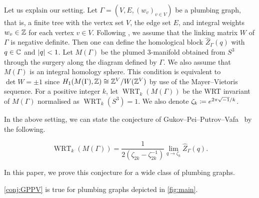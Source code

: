 \documentclass[11pt,a4paper,lualatex]{amsart}
\DeclareMathOperator{\WRT}{WRT}
\numberwithin{equation}{section} %
\begin{document}
Let us explain our setting.
Let $ \Gamma = (V, E, (w_v)_{v \in V}) $ be a plumbing graph, that is, a finite tree with the vertex set $ V $, the edge set $ E $, and integral weights $ w_v \in \mathbb{Z} $ for each vertex $ v \in V $.
Following \cite{GPPV}, we assume that the linking matrix $ W $ of $ \Gamma $ is negative definite.
Then one can define the homological block $ \widehat{Z}_\Gamma (q) $ with $ q \in \mathbb{C} $ and $ \left\lvert q\right\rvert < 1 $. 
Let $ M(\Gamma) $ be the plumed 3-manifold obtained from $ S^3 $ through the surgery along the diagram defined by $ \Gamma $.
We also assume that $ M(\Gamma) $ is an integral homology sphere.
This condition is equivalent to $ \det W = \pm 1 $ since $ H_1(M(\Gamma), \mathbb{Z}) \cong \mathbb{Z}^V / W(\mathbb{Z}^V)$ by use of the Mayer--Vietoris sequence. 
For a positive integer $ k $, let $ \WRT_k(M(\Gamma)) $ be the WRT invariant of $ M(\Gamma) $ normalised as $ \WRT_k(S^3) = 1 $. 
We also denote $ \zeta_k \coloneqq e^{2\pi\iu/k} $.

In the above setting, we can state the conjecture of Gukov--Pei--Putrov--Vafa~\cite{GPPV} by the following.

\begin{conj} \label{conj:GPPV}
	\[
	\WRT_k(M(\Gamma))
	= \frac{1}{2(\zeta_{2k} - \zeta_{2k}^{-1})}
	\lim_{q \to \zeta_k} \widehat{Z}_\Gamma \left( q \right).
	\]
\end{conj}

In this paper, we prove this conjecture for a wide class of plumbing graphs.

\begin{thm} \label{thm:main}
	\cref{conj:GPPV} is true for plumbing graphs depicted in \cref{fig:main}.
\end{thm}
\end{document}
